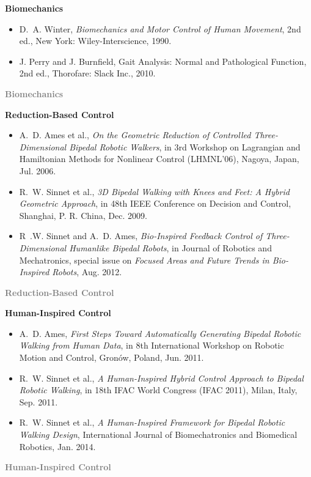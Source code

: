 \documentclass{beamer}
\begin{document}
\begin{frame}[t]
   {
    {\Large \bf Biomechanics}
    \begin{itemize}
    \item
      D.~A. Winter, {\em Biomechanics and Motor Control of Human Movement}, 2nd ed., New York: Wiley-Interscience, 1990.\\
    \item
      J. Perry and J. Burnfield, Gait Analysis: Normal and Pathological Function, 2nd ed., Thorofare: Slack Inc., 2010.\\
    \end{itemize}
  }
   {
    \textcolor{gray}{\Large \bf Biomechanics}\\[1mm]
  }

   {
    {\Large \bf Reduction-Based Control}
    \begin{itemize}
    \item
      A.~D. Ames et al., {\em On the Geometric Reduction of Controlled Three-Dimensional Bipedal Robotic Walkers}, in 3rd Workshop on Lagrangian and Hamiltonian Methods for Nonlinear Control (LHMNL'06), Nagoya, Japan, Jul. 2006.\\
    \item
      R.~W. Sinnet et al., {\em 3D Bipedal Walking with Knees and Feet: A Hybrid Geometric Approach}, in 48th IEEE Conference on Decision and Control, Shanghai, P. R. China, Dec. 2009.
    \item
      R~.W. Sinnet and A.~D. Ames, {\em Bio-Inspired Feedback Control of Three-Dimensional Humanlike Bipedal Robots}, in Journal of Robotics and Mechatronics, special issue on {\em Focused Areas and Future Trends in Bio-Inspired Robots}, Aug. 2012.

    \end{itemize}
  }
   {
    \textcolor{gray}{\Large \bf Reduction-Based Control}\\[1mm]
  }

   {
    {\Large \bf Human-Inspired Control}
    \begin{itemize}
    \item
      A.~D. Ames, {\em First Steps Toward Automatically Generating Bipedal Robotic Walking from Human Data}, in 8th International Workshop on Robotic Motion and Control, Gron{\'o}w, Poland, Jun. 2011.
    \item
      R.~W. Sinnet et al., {\em A Human-Inspired Hybrid Control Approach to Bipedal Robotic Walking}, in 18th IFAC World Congress (IFAC 2011), Milan, Italy, Sep. 2011.
    \item
      R.~W. Sinnet et al., {\em A Human-Inspired Framework for Bipedal Robotic Walking Design}, International Journal of Biomechatronics and Biomedical Robotics, Jan. 2014.
    \end{itemize}
  }
   {
    \textcolor{gray}{\Large \bf Human-Inspired Control}
  }

\end{frame}
\end{document}
